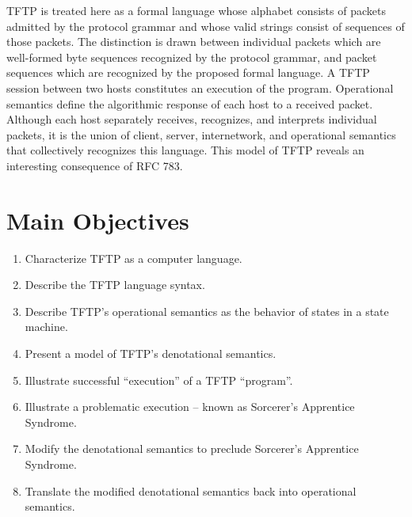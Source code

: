 \documentclass[a0,landscape]{a0poster}
\begin{document}
\begin{multicols}{4}
TFTP is treated here as a formal language whose alphabet consists of packets admitted by the protocol grammar and whose valid strings consist of sequences of those packets. The distinction is drawn between individual packets which are well-formed byte sequences recognized by the protocol grammar, and packet sequences which are recognized by the proposed formal language. A TFTP session between two hosts constitutes an execution of the program. Operational semantics define the algorithmic response of each host to a received packet. Although each host separately receives, recognizes, and interprets individual packets, it is the union of client, server, internetwork, and operational semantics that collectively recognizes this language. This model of TFTP reveals an interesting consequence of RFC 783.


\color{DarkSlateGray} %

\section*{Main Objectives}

\begin{enumerate}
\item Characterize TFTP as a computer language.
\item Describe the TFTP language syntax.
\item Describe TFTP's operational semantics as the behavior of states in a state machine.
\item Present a model of TFTP's denotational semantics.
\item Illustrate successful ``execution'' of a TFTP ``program''.
\item Illustrate a problematic execution -- known as Sorcerer's Apprentice Syndrome.
\item Modify the denotational semantics to preclude Sorcerer's Apprentice Syndrome.
\item Translate the modified denotational semantics back into operational semantics.
\end{enumerate}



\end{multicols}
\end{document}
